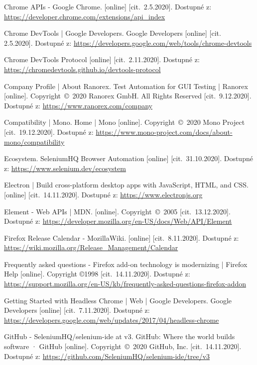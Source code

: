 \begin{thebibliography}{99}
 Chrome APIs - Google Chrome. [online] [cit.~2.5.2020]. Dostupné z: \url{https://developer.chrome.com/extensions/api_index}

 Chrome DevTools  |  Google Developers. Google Developers [online] [cit.~	2.5.2020]. Dostupné z: 	\url{https://developers.google.com/web/tools/chrome-devtools}

 Chrome DevTools Protocol [online] [cit.~2.11.2020]. Dostupné z: \url{https://chromedevtools.github.io/devtools-protocol}

 Company Profile | About Ranorex. Test Automation for GUI Testing | Ranorex [online]. Copyright~©~2020 Ranorex GmbH. All Rights Reserved [cit.~9.12.2020]. Dostupné z: \url{https://www.ranorex.com/company}

 Compatibility | Mono. Home | Mono [online]. Copyright~©~2020 Mono Project [cit.~19.12.2020]. Dostupné z: \url{https://www.mono-project.com/docs/about-mono/compatibility}

 Ecosystem. SeleniumHQ Browser Automation [online] [cit.~31.10.2020]. Dostupné z: \url{https://www.selenium.dev/ecosystem}

 Electron | Build cross-platform desktop apps with JavaScript, HTML, and CSS. [online] [cit.~14.11.2020]. Dostupné z: \url{https://www.electronjs.org}

 Element - Web APIs | MDN. [online]. Copyright~©~2005 [cit.~13.12.2020]. Dostupné z: \url{https://developer.mozilla.org/en-US/docs/Web/API/Element}

 Firefox Release Calendar - MozillaWiki. [online] [cit.~8.11.2020]. Dostupné z: \url{https://wiki.mozilla.org/Release_Management/Calendar}

 Frequently asked questions - Firefox add-on technology is modernizing | Firefox Help [online]. Copyright ©1998 [cit.~14.11.2020]. Dostupné z: \url{https://support.mozilla.org/en-US/kb/frequently-asked-questions-firefox-addon}

 Getting Started with Headless Chrome  |  Web  |  Google Developers. Google Developers [online] [cit.~7.11.2020]. Dostupné z: \url{https://developers.google.com/web/updates/2017/04/headless-chrome}

 GitHub - SeleniumHQ/selenium-ide at v3. GitHub: Where the world builds software · GitHub [online]. Copyright~©~2020 GitHub, Inc. [cit.~14.11.2020]. Dostupné z: \url{https://github.com/SeleniumHQ/selenium-ide/tree/v3}


\end{thebibliography}
